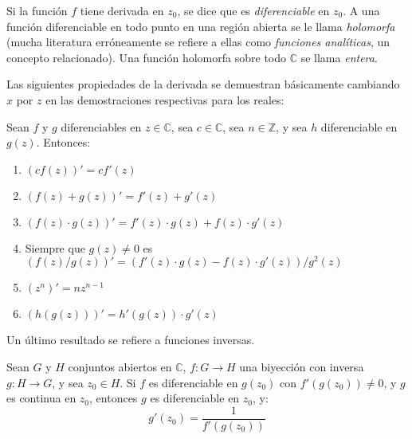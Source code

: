   Si la función \(f\) tiene derivada en \(z_0\),
  se dice que es \emph{diferenciable} en \(z_0\).
  A una función diferenciable en todo punto en una región abierta
  se le llama \emph{holomorfa}%
  (mucha literatura erróneamente se refiere a ellas
   como \emph{funciones analíticas},
   un concepto relacionado).
  Una función holomorfa sobre todo \(\mathbb{C}\)
  se llama \emph{entera}.%

  Las siguientes propiedades de la derivada
  se demuestran básicamente
  cambiando \(x\) por \(z\)
  en las demostraciones respectivas para los reales:
  \begin{lemma}
    \label{lem:complex-derivative-rules}
    Sean \(f\) y \(g\) diferenciables en \(z \in \mathbb{C}\),
    sea \(c \in \mathbb{C}\),
    sea \(n \in \mathbb{Z}\),
    y sea \(h\) diferenciable en \(g(z)\).
    Entonces:
    \begin{enumerate}[label=(\roman*), ref=(\roman*)]
    \item
      \((c f(z))'
	  = c f'(z)\)
    \item
      \((f(z) + g(z))'
	  = f'(z) + g'(z)\)
    \item
      \((f(z) \cdot g(z))'
	  = f'(z) \cdot g(z) + f(z) \cdot g'(z)\)
    \item
      Siempre que \(g(z) \ne 0\) es
      \((f(z) / g(z))'
	  = (f'(z) \cdot g(z) - f(z) \cdot g'(z)) / g^2 (z)\)
    \item
      \((z^n)'
	  = n z^{n - 1}\)
    \item
      \((h(g(z)))'
	  = h'(g(z)) \cdot g'(z)\)
    \end{enumerate}
  \end{lemma}
  Un último resultado se refiere a funciones inversas.
  \begin{lemma}
    \label{lem:complex-derivative-inverse}
    Sean \(G\) y \(H\) conjuntos abiertos en \(\mathbb{C}\),
    \(f \colon G \rightarrow H\) una biyección
    con inversa \(g \colon H \rightarrow G\),
    y sea \(z_0 \in H\).
    Si \(f\) es diferenciable en \(g(z_0)\)
    con \(f'(g(z_0)) \ne 0\),
    y \(g\) es continua en \(z_0\),
    entonces \(g\) es diferenciable en \(z_0\),
    y:
    \begin{equation*}
      g'(z_0)
	= \frac{1}{f'(g(z_0))}
    \end{equation*}
  \end{lemma}
